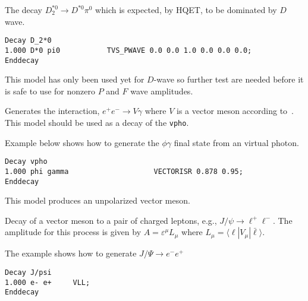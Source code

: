 \Example
The decay $D_2^{*0}\rightarrow D^{*0} \pi^0$ which is expected, 
by HQET, to be dominated by $D$ wave.
\begin{verbatim}
Decay D_2*0
1.000 D*0 pi0           TVS_PWAVE 0.0 0.0 1.0 0.0 0.0 0.0;
Enddecay
\end{verbatim}

\Notes
This model has only been used yet for $D$-wave so
further test are needed before it is safe to use for nonzero
$P$ and $F$ wave amplitudes.





\label{vectorisr}



\Expl
Generates the interaction, $e^+ e^- \rightarrow V \gamma$ where $V$
is a vector meson according
to~\cite{Bonn71}. This model should be used as a decay of the {\tt vpho}.

\Example
Example below shows how to generate the $\phi\gamma$ final state from
an virtual photon.
\begin{verbatim}
Decay vpho
1.000 phi gamma                    VECTORISR 0.878 0.95;
Enddecay
\end{verbatim}

\Notes
This model produces an unpolarized vector meson.




\label{vll}



\Expl
Decay of a vector meson to a pair of charged leptons, e.g., 
$J/\psi\rightarrow\ell^+\ell^-$. The amplitude for this
process is given by $A=\varepsilon^{\mu}L_{\mu}$ where
$L_{\mu}=\langle \ell | V_{\mu} | \bar\ell \rangle$.

\Example
The example shows how to generate $J/\Psi \rightarrow e^-e^+$
\begin{verbatim}
Decay J/psi
1.000 e- e+     VLL;
Enddecay
\end{verbatim}











\label{vsppwave}


